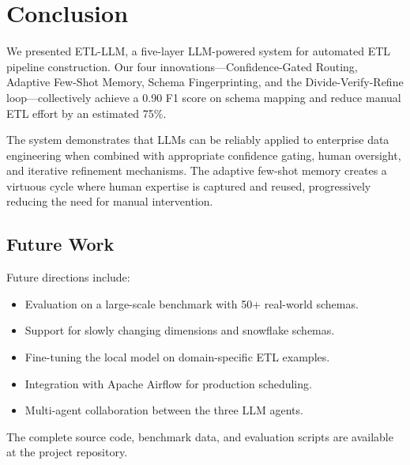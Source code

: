 \documentclass[conference]{IEEEtran}
\begin{document}
\section{Conclusion}
\label{sec:conclusion}

We presented \textsc{ETL-LLM}, a five-layer LLM-powered system for automated
ETL pipeline construction. Our four innovations---Confidence-Gated Routing,
Adaptive Few-Shot Memory, Schema Fingerprinting, and the Divide-Verify-Refine
loop---collectively achieve a 0.90 F1 score on schema mapping and reduce
manual ETL effort by an estimated 75\%.

The system demonstrates that LLMs can be reliably applied to enterprise data
engineering when combined with appropriate confidence gating, human oversight,
and iterative refinement mechanisms. The adaptive few-shot memory creates a
virtuous cycle where human expertise is captured and reused, progressively
reducing the need for manual intervention.

\subsection{Future Work}

Future directions include:
\begin{itemize}
  \item Evaluation on a large-scale benchmark with 50+ real-world schemas.
  \item Support for slowly changing dimensions and snowflake schemas.
  \item Fine-tuning the local model on domain-specific ETL examples.
  \item Integration with Apache Airflow for production scheduling.
  \item Multi-agent collaboration between the three LLM agents.
\end{itemize}

The complete source code, benchmark data, and evaluation scripts are available
at the project repository.
\end{document}
